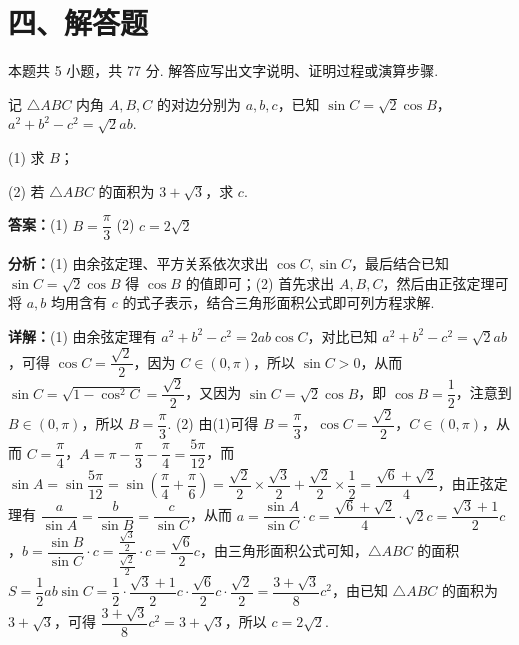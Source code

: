 \section*{四、解答题}
本题共 5 小题，共 77 分. 解答应写出文字说明、证明过程或演算步骤.

\begin{question}[points=13]
记 $\triangle ABC$ 内角 $A,B,C$ 的对边分别为 $a,b,c$，已知 $\sin C=\sqrt{2}\cos B$，$a^2+b^2-c^2=\sqrt{2}ab$.

(1) 求 $B$；

(2) 若 $\triangle ABC$ 的面积为 $3+\sqrt{3}$，求 $c$.
\begin{solution}
\textbf{答案：}(1) $B=\dfrac{\pi}{3}$ (2) $c=2\sqrt{2}$

\textbf{分析：}(1) 由余弦定理、平方关系依次求出 $\cos C,\sin C$，最后结合已知 $\sin C=\sqrt{2}\cos B$ 得 $\cos B$ 的值即可；(2) 首先求出 $A,B,C$，然后由正弦定理可将 $a,b$ 均用含有 $c$ 的式子表示，结合三角形面积公式即可列方程求解.

\textbf{详解：}(1) 由余弦定理有 $a^2+b^2-c^2=2ab\cos C$，对比已知 $a^2+b^2-c^2=\sqrt{2}ab$，可得 $\cos C=\dfrac{\sqrt{2}}{2}$，因为 $C\in(0,\pi)$，所以 $\sin C>0$，从而 $\sin C=\sqrt{1-\cos^2 C}=\dfrac{\sqrt{2}}{2}$，又因为 $\sin C=\sqrt{2}\cos B$，即 $\cos B=\dfrac{1}{2}$，注意到 $B\in(0,\pi)$，所以 $B=\dfrac{\pi}{3}$.
(2) 由(1)可得 $B=\dfrac{\pi}{3}$，$\cos C=\dfrac{\sqrt{2}}{2}$，$C\in(0,\pi)$，从而 $C=\dfrac{\pi}{4}$，$A=\pi-\dfrac{\pi}{3}-\dfrac{\pi}{4}=\dfrac{5\pi}{12}$，而 $\sin A=\sin\dfrac{5\pi}{12}=\sin\left(\dfrac{\pi}{4}+\dfrac{\pi}{6}\right)=\dfrac{\sqrt{2}}{2}\times\dfrac{\sqrt{3}}{2}+\dfrac{\sqrt{2}}{2}\times\dfrac{1}{2}=\dfrac{\sqrt{6}+\sqrt{2}}{4}$，由正弦定理有 $\dfrac{a}{\sin A}=\dfrac{b}{\sin B}=\dfrac{c}{\sin C}$，从而 $a=\dfrac{\sin A}{\sin C}\cdot c=\dfrac{\sqrt{6}+\sqrt{2}}{4}\cdot\sqrt{2}c=\dfrac{\sqrt{3}+1}{2}c$，$b=\dfrac{\sin B}{\sin C}\cdot c=\dfrac{\frac{\sqrt{3}}{2}}{\frac{\sqrt{2}}{2}}\cdot c=\dfrac{\sqrt{6}}{2}c$，由三角形面积公式可知，$\triangle ABC$ 的面积 $S=\dfrac{1}{2}ab\sin C=\dfrac{1}{2}\cdot\dfrac{\sqrt{3}+1}{2}c\cdot\dfrac{\sqrt{6}}{2}c\cdot\dfrac{\sqrt{2}}{2}=\dfrac{3+\sqrt{3}}{8}c^2$，由已知 $\triangle ABC$ 的面积为 $3+\sqrt{3}$，可得 $\dfrac{3+\sqrt{3}}{8}c^2=3+\sqrt{3}$，所以 $c=2\sqrt{2}$.
\end{solution}
\end{question}

